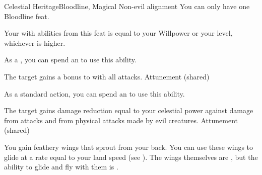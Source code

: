     \begin{feat}{Celestial Heritage}{Bloodline, Magical}
        \featpre Non-evil alignment
         You can only have one Bloodline feat.
        \featben

         Your  with abilities from this feat is equal to your Willpower or your level, whichever is higher.

         As a , you can spend an  to use this ability.
        \begin{ability}
            \begin{spelltargetinginfo}
            \end{spelltargetinginfo}
            \begin{spelleffects}
                \spelleffect The target gains a  bonus to  with all attacks.
                \spelldur Attunement (shared)
            \end{spelleffects}
        \end{ability}

         As a standard action, you can spend an  to use this ability.
        \begin{ability}
            \begin{spelltargetinginfo}
            \end{spelltargetinginfo}
            \begin{spelleffects}
                \spelleffect The target gains damage reduction equal to your celestial power against damage from  attacks and from physical attacks made by evil creatures.
                \spelldur Attunement (shared)
            \end{spelleffects}
        \end{ability}

         You gain feathery wings that sprout from your back.
        You can use these wings to glide at a rate equal to your land speed (see ).
        The wings themselves are , but the ability to glide and fly with them is .


\end{feat}
